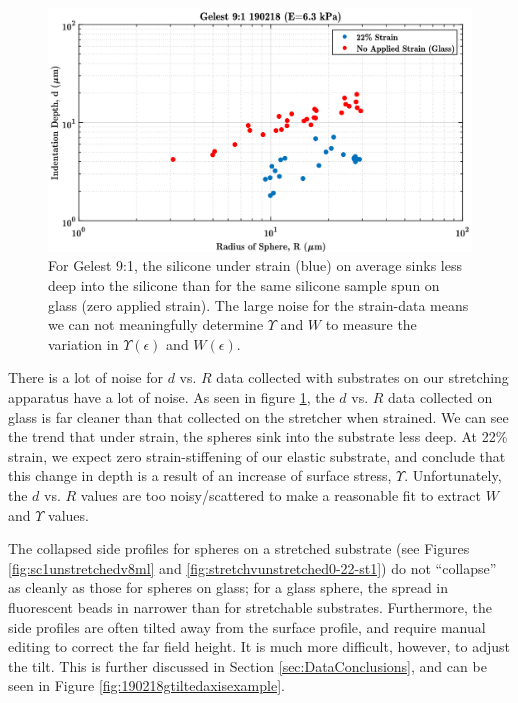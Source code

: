 \begin{figure}[h!]
	\centering
	\includegraphics[width=\linewidth]{Chapters/Figures/g190218_glass_vs_22percent_dvsR.pdf}
	\caption[Glass vs. Stretched d vs. R]{For Gelest 9:1, the silicone under strain (blue) on average sinks less deep into the silicone than for the same silicone sample spun on glass (zero applied strain). The large noise for the strain-data means we can not meaningfully determine $ \Upsilon $ and $ W $ to measure the variation in $ \Upsilon(\epsilon)$ and $W(\epsilon)$.}
	\label{fig:glassvsstretched190218}
\end{figure}

There is a lot of noise for $ d $ vs. $ R $ data collected with substrates on our stretching apparatus have a lot of noise. As seen in figure \ref{fig:glassvsstretched190218}, the $ d $ vs. $ R $ data collected on glass is far cleaner than that collected on the stretcher when strained. We can see the trend that under strain, the spheres sink into the substrate less deep. At 22\% strain, we expect zero strain-stiffening of our elastic substrate, and conclude that this change in depth is a result of an increase of surface stress, $ \Upsilon $. Unfortunately, the $ d $ vs. $ R $ values are too noisy/scattered to make a reasonable fit to extract $ W $ and $ \Upsilon $ values.

The collapsed side profiles for spheres on a stretched substrate (see Figures \ref{fig:sc1unstretchedv8ml} and \ref{fig:stretchvunstretched0-22-st1}) do not ``collapse'' as cleanly as those for spheres on glass; for a glass sphere, the spread in fluorescent beads in narrower than for stretchable substrates. Furthermore, the side profiles are often tilted away from the surface profile, and require manual editing to correct the far field height. It is much more difficult, however, to adjust the tilt. This is further discussed in Section \ref{sec:DataConclusions}, and can be seen in Figure \ref{fig:190218gtiltedaxisexample}.   

